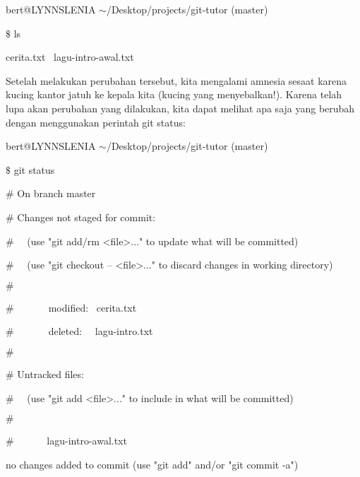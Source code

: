 bert@LYNNSLENIA  $  \sim  $/Desktop/projects/git-tutor (master) \par
 $  \$  $ ls \par
cerita.txt~ lagu-intro-awal.txt \par
\vspace{12pt}
Setelah melakukan perubahan tersebut, kita mengalami amnesia sesaat karena kucing kantor jatuh ke kepala kita (kucing yang menyebalkan!). Karena telah lupa akan perubahan yang dilakukan, kita dapat melihat apa saja yang berubah dengan menggunakan perintah git status: \par
\noindent 
{\fontsize{10pt}{10pt}\selectfont bert@LYNNSLENIA  $  \sim  $/Desktop/projects/git-tutor (master)} \par
\noindent 
{\fontsize{10pt}{10pt}\selectfont  $  \$  $ git status} \par
\noindent 
{\fontsize{10pt}{10pt}\selectfont  $  \#  $ On branch master} \par
\noindent 
{\fontsize{10pt}{10pt}\selectfont  $  \#  $ Changes not staged for commit:} \par
\noindent 
{\fontsize{10pt}{10pt}\selectfont  $  \#  $~~ (use "git add/rm <file>..." to update what will be committed)} \par
\noindent 
{\fontsize{10pt}{10pt}\selectfont  $  \#  $~~ (use "git checkout -- <file>..." to discard changes in working directory)} \par
\noindent 
{\fontsize{10pt}{10pt}\selectfont  $  \#  $} \par
\noindent 
{\fontsize{10pt}{10pt}\selectfont  $  \#  $~~~~~~~modified:~  cerita.txt} \par
\noindent 
{\fontsize{10pt}{10pt}\selectfont  $  \#  $~~~~~~~deleted:~~  lagu-intro.txt} \par
\noindent 
{\fontsize{10pt}{10pt}\selectfont  $  \#  $} \par
\noindent 
{\fontsize{10pt}{10pt}\selectfont  $  \#  $ Untracked files:} \par
\noindent 
{\fontsize{10pt}{10pt}\selectfont  $  \#  $~~ (use "git add <file>..." to include in what will be committed)} \par
\noindent 
{\fontsize{10pt}{10pt}\selectfont  $  \#  $} \par
\noindent 
{\fontsize{10pt}{10pt}\selectfont  $  \#  $~~~~~~ lagu-intro-awal.txt} \par
\noindent 
{\fontsize{10pt}{10pt}\selectfont no changes added to commit (use "git add" and/or "git commit -a")} \par
